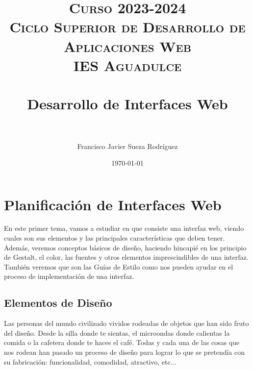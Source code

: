 


\title{
\normalfont \normalsize
\textsc{{\bfseries Curso 2023-2024} \\ Ciclo Superior de Desarrollo de Aplicaciones Web \\ IES Aguadulce} \\ [25pt]
\horrule{0.5pt} \\[0.4cm]
\huge Desarrollo de Interfaces Web \\
\horrule{0.5pt} \\[0.4cm]
}

\author{Francisco Javier Sueza Rodríguez}
\date{\normalsize\today}

\makeglossaries
{}



\maketitle

\newpage

\tableofcontents

\listoffigures


\newpage

\chapter{Planificación de Interfaces Web}
En este primer tema, vamos a estudiar en que consiste una interfaz web, viendo cuales son sus elementos  y las principales características que deben tener. Además, veremos conceptos básicos de diseño, haciendo hincapié en los principio de Gestalt, el color, las fuentes y otros elementos imprescindibles de una interfaz. También veremos que son las Guías de Estilo como nos pueden ayudar en el proceso de implementación de una interfaz.

\section{Elementos de Diseño}
Las personas del mundo civilizado vividos rodeadas de objetos que han sido fruto del diseño. Desde la silla donde te sientas, el microondas donde calientas la comida o la cafetera donde te haces el café. Todas y cada una de las cosas que nos rodean han pasado un proceso de diseño para lograr lo que se pretendía con su fabricación: funcionalidad, comodidad, atractivo, etc...

